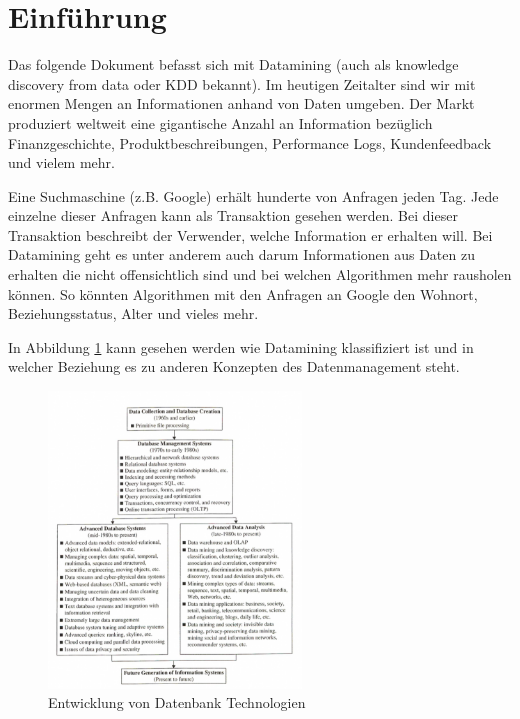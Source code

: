 
\section{Einführung}
\label{sec:intro}

Das folgende Dokument befasst sich mit Datamining (auch als knowledge discovery from data oder KDD bekannt).  Im heutigen Zeitalter sind wir mit enormen Mengen an Informationen anhand von Daten umgeben. Der Markt produziert weltweit eine gigantische Anzahl an Information bezüglich Finanzgeschichte, Produktbeschreibungen, Performance Logs, Kundenfeedback und vielem mehr. 

Eine Suchmaschine (z.B. Google) erhält hunderte von Anfragen jeden Tag. Jede einzelne dieser Anfragen kann als Transaktion gesehen werden. Bei dieser Transaktion beschreibt der Verwender, welche Information er erhalten will. Bei Datamining geht es unter anderem auch darum Informationen aus Daten zu erhalten die nicht offensichtlich sind und bei welchen Algorithmen mehr rausholen können. So könnten Algorithmen mit den Anfragen an Google den Wohnort, Beziehungsstatus, Alter und vieles mehr.

In Abbildung \ref{fig:dbevolution} kann gesehen werden wie Datamining klassifiziert ist und in welcher Beziehung es zu anderen Konzepten des Datenmanagement steht.

\begin{figure}[!h]\centering
	\includegraphics[width=0.6\textwidth]{images/dbevolution}
	\caption{Entwicklung von Datenbank Technologien \cite{DataMiningConceptsAndTechniques}}
	\label{fig:dbevolution}
\end{figure}